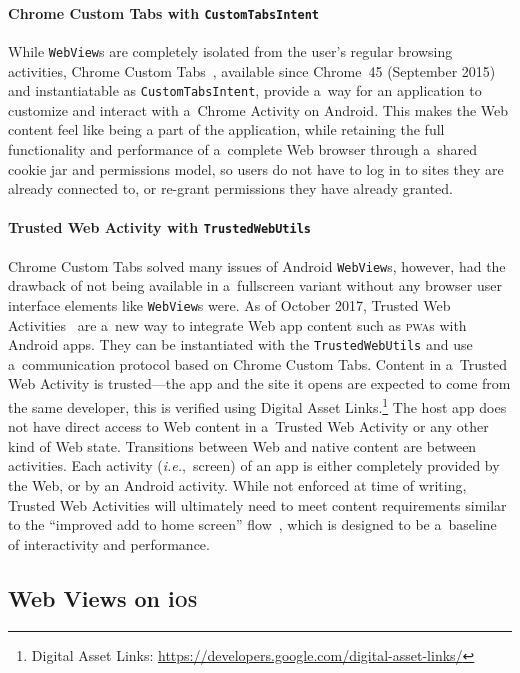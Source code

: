 \documentclass[sigconf]{acmart}
\begin{document}
\paragraph{Chrome Custom Tabs with \texttt{CustomTabsIntent}}

While \texttt{WebView}s are completely isolated from the user's regular browsing activities,
Chrome Custom Tabs~\cite{kinlan2016customtabs}, available since Chrome~45 (September 2015)
and instantiatable as \texttt{CustomTabsIntent}, provide a~way for an application
to customize and interact with a~Chrome Activity on Android.
This makes the Web content feel like being a part of the application,
while retaining the full functionality and performance of a~complete Web browser
through a~shared cookie jar and permissions model, so users do not have to log in
to sites they are already connected to, or re-grant permissions they have already granted.

\paragraph{Trusted Web Activity with \texttt{TrustedWebUtils}}

Chrome Custom Tabs solved many issues of Android \texttt{WebView}s,
however, had the drawback of not being available in a~fullscreen variant
without any browser user interface elements like \texttt{WebView}s were.
As of October 2017, Trusted Web Activities~\cite{googledevelopers2017twa} are a~new way to
integrate Web app content such as \textsc{pwa}s with Android apps.
They can be instantiated with the \texttt{TrustedWebUtils}
and use a~communication protocol based on Chrome Custom Tabs.
Content in a~Trusted Web Activity is trusted---the app and the site it opens
are expected to come from the same developer, this is verified using Digital Asset
Links.\footnote{Digital Asset Links:
\url{https://developers.google.com/digital-asset-links/}}
The host app does not have direct access to Web content in a~Trusted Web Activity
or any other kind of Web state.
Transitions between Web and native content are between activities.
Each activity (\emph{i.e.},\ screen) of an app is either completely provided by the Web,
or by an Android activity.
While not enforced at time of writing, Trusted Web Activities
will ultimately need to meet content requirements
similar to the ``improved add to home screen'' flow~\cite{kinlan2017a2hs},
which is designed to be a~baseline of interactivity and performance.

\subsection{Web Views on i\textsc{os}}
\end{document}
